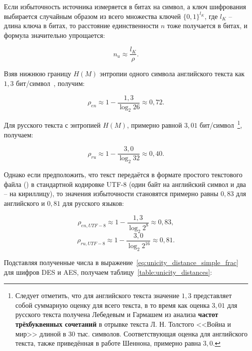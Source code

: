 Если избыточность источника измеряется в битах на символ, а ключ шифрования выбирается случайным образом из всего множества ключей $\{0, 1\}^{l_K}$, где $l_K$ -- длина ключа в битах, то расстояние единственности $n$ тоже получается в битах, и формула значительно упрощается:

\begin{equation}\label{eq:unicity_distance_simple_frac}
n_u \approx \frac{l_K}{\rho}.
\end{equation}

Взяв нижнюю границу $H(M)$ энтропии одного символа английского текста как $1{,}3$ бит/символ~\cite{Shannon:1951, Schneier:2002}, получим:

	\[ \rho _{en} \approx 1 - \frac{ 1{,}3 }{ \log _2 {26} } \approx 0{,}72.\]

Для русского текста с энтропией $H(M)$, примерно равной $3{,}01$ бит/символ~\cite{Lebedev:1958}\footnote{Следует отметить, что для английского текста значение $1{,}3$ представляет собой суммарную оценку для всего текста, в то время как оценка $3{,}01$ для русского текста получена Лебедевым и Гармашем из анализа \textbf{частот трёхбуквенных сочетаний} в отрывке текста Л. Н. Толстого <<Война и мир>> длиной в 30 тыс. символов. Соответствующая оценка для английского текста, также приведённая в работе Шеннона, примерно равна $3{,}0$.}, получаем:

	\[ \rho _{ru} \approx 1 - \frac{ 3{,}0 }{ \log _2 {32} } \approx 0{,}40.\]

Однако если предположить, что текст передаётся в формате простого текстового файла () в стандартной кодировке UTF-8 (один байт на английский символ и два -- на кириллицу), то значения избыточности становятся примерно равны $0{,}83$ для английского и $0{,}81$ для русского языков:

	\[ \rho _{en, UTF-8} \approx 1 - \frac{ 1{,}3 }{ \log _2 {2^{8}} } \approx 0{,}83,\]
	\[ \rho _{ru, UTF-8} \approx 1 - \frac{ 3{,}0 }{ \log _2 {2^{16}} } \approx 0{,}81.\]

Подставляя полученные числа в выражение~\ref{eq:unicity_distance_simple_frac} для шифров DES и AES, получаем таблицу~\ref{table:unicity_distances}:

